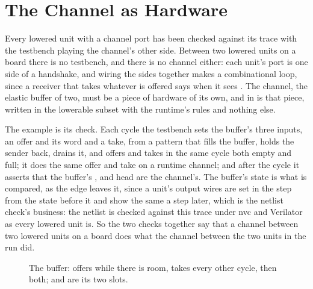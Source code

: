 \section{The Channel as Hardware}
\label{sec:x-buffer}

Every lowered unit with a channel port has been checked against its
trace with the testbench playing the channel's other side. Between
two lowered units on a board there is no testbench, and there is no
channel either: each unit's port is one side of a handshake, and
wiring the sides together makes a combinational loop, since a
receiver that takes whatever is offered says  when it
sees . The channel, the elastic buffer of two, must be a
piece of hardware of its own, and  in
 is that piece, written in the lowerable subset
with the runtime's rules and nothing else.

The example is its check. Each cycle the testbench sets the buffer's
three inputs, an offer and its word and a take, from a pattern that
fills the buffer, holds the sender back, drains it, and offers and
takes in the same cycle both empty and full; it does the same offer
and take on a runtime channel; and after the cycle it asserts that the
buffer's ,  and head are the channel's. The
buffer's state is what is compared, as the edge leaves it, since a
unit's output wires are set in the step from the state before it and
show the same a step later, which is the netlist check's business:
the netlist is checked against this trace under nvc and Verilator as
every lowered unit is. So the two checks together say that a channel
between two lowered units on a board does what the channel between
the two units in the run did.

\begin{figure}[htbp]
\centering

\caption{The buffer: offers while there is room, takes every other
cycle, then both;  and  are its
two slots.}
\label{fig:x-buffer}
\end{figure}




